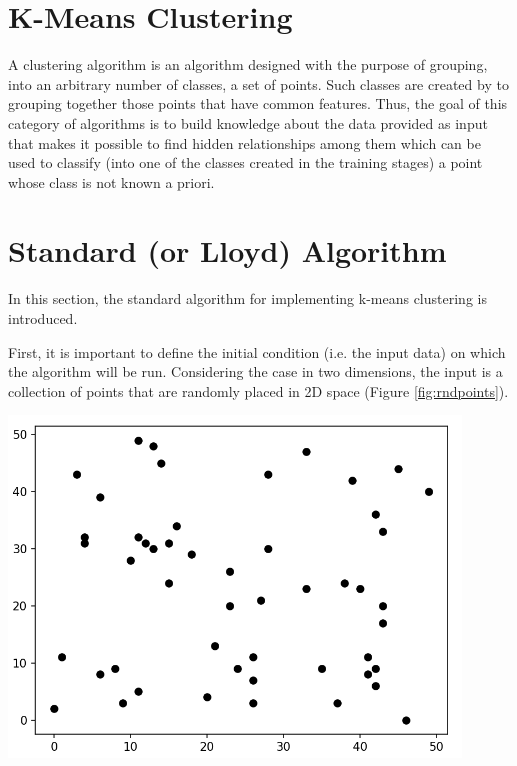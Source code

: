 \documentclass{report}
\begin{document}
\begin{minipage}[b]{0.48\textwidth}
  \section*{K-Means Clustering}
  A clustering algorithm is an algorithm designed with the purpose of grouping, into an arbitrary number of classes, a set of points. Such classes are created by to grouping together those points that have common features. Thus, the goal of this category of algorithms is to build knowledge about the data provided as input that makes it possible to find hidden relationships among them which can be used to classify (into one of the classes created in the training stages) a point whose class is not known a priori.

  \section*{Standard (or Lloyd) Algorithm}
  In this section, the standard algorithm for implementing k-means clustering is introduced. 

  First, it is important to define the initial condition (i.e. the input data) on which the algorithm will be run. Considering the case in two dimensions, the input is a collection of points that are randomly placed in 2D space (Figure \ref{fig:rndpoints}).

  \begin{center} 
      \includegraphics[width = 0.9\textwidth]{imgs/rndpoints.png}
      \label{fig:rndpoints}
  \end{center}


\end{minipage}
\end{document}
